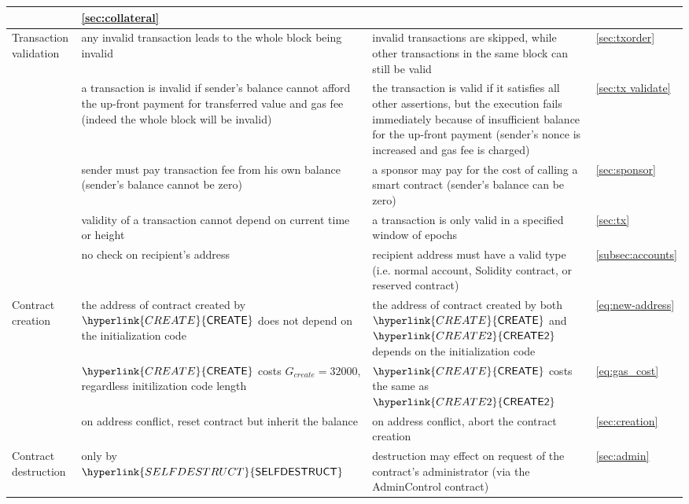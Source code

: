 \documentclass[fleqn,10pt]{SelfArx} %
\begin{document}
\begin{center}
\begin{tabu}{l X X l}
			& \cref{sec:collateral}\\
			\hline
			Transaction validation & 
			{any invalid transaction leads to the whole block being invalid} & 
			{invalid transactions are skipped, while other transactions in the same block can still be valid} & \cref{sec:txorder}\smallskip\\
			& {a transaction is invalid if sender's balance cannot afford the up-front payment for transferred value and gas fee (indeed the whole block will be invalid)} & {the transaction is valid if it satisfies all other assertions, but the execution fails immediately because of insufficient balance for the up-front payment (sender's nonce is increased and gas fee is charged)}	& \cref{sec:tx validate} \\
			& sender must pay transaction fee from his own balance (sender's balance cannot be zero)	& a sponsor may pay for the cost of calling a smart contract (sender's balance can be zero)	& \cref{sec:sponsor} \\
			& validity of a transaction cannot depend on current time or height & a transaction is only valid in a specified window of epochs & \cref{sec:tx} \\
			& no check on recipient's address & recipient address must have a valid type (i.e. normal account, Solidity contract, or reserved contract)  & \cref{subsec:accounts} \\
			\hline
			Contract creation & the address of contract created by $\hyperlink{CREATE}{\op{CREATE}}$ does not depend on the initialization code  &  the address of contract created by both $\hyperlink{CREATE}{\op{CREATE}}$ and $\hyperlink{CREATE2}{\op{CREATE2}}$ depends on the initialization code &  \cref{eq:new-address} \\
			 & 
			$\hyperlink{CREATE}{\op{CREATE}}$ costs $G_{create}=32000$, regardless initilization code length	
			& $\hyperlink{CREATE}{\op{CREATE}}$ costs the same as $\hyperlink{CREATE2}{\op{CREATE2}}$  & \cref{eq:gas_cost} \\
			& on address conflict, reset contract but inherit the balance &  
			on address conflict, abort the contract creation   
			& \cref{sec:creation}  \smallskip\\
			\hline
			Contract destruction & only by $\hyperlink{SELFDESTRUCT}{\op{SELFDESTRUCT}}$ & 
			destruction may effect on request of the contract's administrator
			(via the AdminControl contract) & \cref{sec:admin}\\

\end{tabu}
\end{center}
\end{document}
